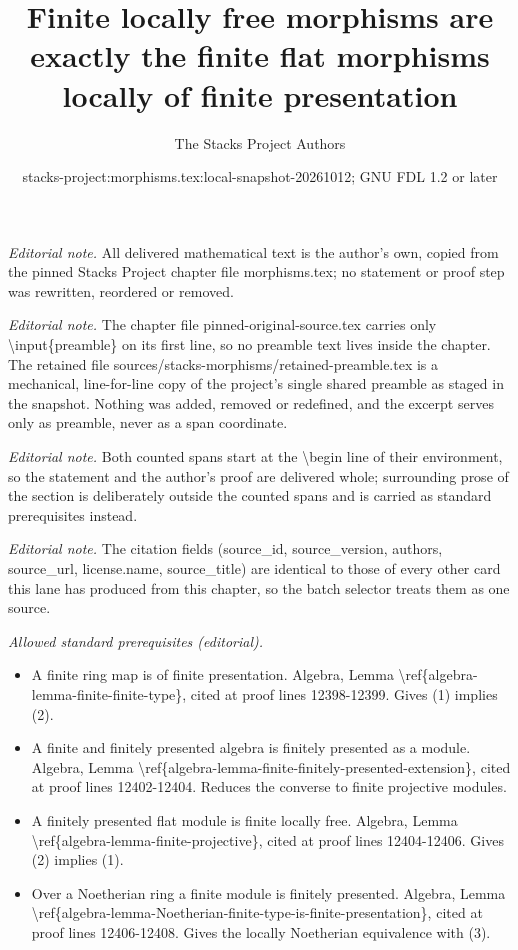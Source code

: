 \documentclass[10pt,a4paper]{amsart}
\title{Finite locally free morphisms are exactly the finite flat morphisms locally of finite presentation}
\author{The Stacks Project Authors}
\date{stacks-project:morphisms.tex:local-snapshot-20261012; GNU FDL 1.2 or later}
\theoremstyle{plain}
\theoremstyle{definition}
\theoremstyle{remark}
\numberwithin{equation}{subsection}
\begin{document}
\maketitle
\setcounter{subsection}{1}
\noindent\textit{Editorial note.} All delivered mathematical text is the author's own, copied from the pinned Stacks Project chapter file morphisms.tex; no statement or proof step was rewritten, reordered or removed.\par\medskip
\noindent\textit{Editorial note.} The chapter file pinned-original-source.tex carries only \textbackslash{}input\{preamble\} on its first line, so no preamble text lives inside the chapter. The retained file sources/stacks-morphisms/retained-preamble.tex is a mechanical, line-for-line copy of the project's single shared preamble as staged in the snapshot. Nothing was added, removed or redefined, and the excerpt serves only as preamble, never as a span coordinate.\par\medskip
\noindent\textit{Editorial note.} Both counted spans start at the \textbackslash{}begin line of their environment, so the statement and the author's proof are delivered whole; surrounding prose of the section is deliberately outside the counted spans and is carried as standard prerequisites instead.\par\medskip
\noindent\textit{Editorial note.} The citation fields (source\_id, source\_version, authors, source\_url, license.name, source\_title) are identical to those of every other card this lane has produced from this chapter, so the batch selector treats them as one source.\par\medskip
\noindent\textit{Allowed standard prerequisites (editorial).}\begin{itemize}
\item A finite ring map is of finite presentation. Algebra, Lemma \textbackslash{}ref\{algebra-lemma-finite-finite-type\}, cited at proof lines 12398-12399. Gives (1) implies (2).
\item A finite and finitely presented algebra is finitely presented as a module. Algebra, Lemma \textbackslash{}ref\{algebra-lemma-finite-finitely-presented-extension\}, cited at proof lines 12402-12404. Reduces the converse to finite projective modules.
\item A finitely presented flat module is finite locally free. Algebra, Lemma \textbackslash{}ref\{algebra-lemma-finite-projective\}, cited at proof lines 12404-12406. Gives (2) implies (1).
\item Over a Noetherian ring a finite module is finitely presented. Algebra, Lemma \textbackslash{}ref\{algebra-lemma-Noetherian-finite-type-is-finite-presentation\}, cited at proof lines 12406-12408. Gives the locally Noetherian equivalence with (3).
\end{itemize}\medskip
\end{document}
